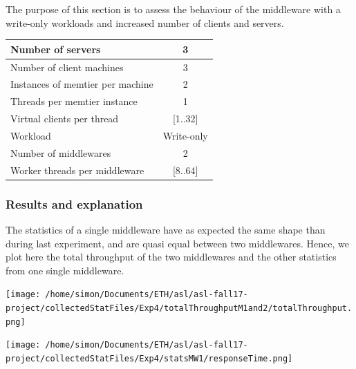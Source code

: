 \documentclass[11pt,a4paper]{article}
\begin{document}
The purpose of this section is to assess the behaviour of the middleware with a write-only workloads and increased number of clients and servers.

\begin{center}
	\scriptsize{
		\begin{tabular}{|l|c|}
			\hline Number of servers                & 3          \\ 
			\hline Number of client machines        & 3          \\ 
			\hline Instances of memtier per machine & 2          \\ 
			\hline Threads per memtier instance     & 1          \\
			\hline Virtual clients per thread       & [1..32]    \\ 
			\hline Workload                         & Write-only \\
			\hline Number of middlewares            & 2          \\
			\hline Worker threads per middleware    & [8..64]    \\
			\hline 
		\end{tabular}
	} 
\end{center}

\subsubsection{Results and explanation}

The statistics of a single middleware have as expected the same shape than during last experiment, and are quasi equal between two middlewares. Hence, we plot here the total throughput of the two middlewares and the other statistics from one single middleware. 

\begin{center}
\texttt{[image: /home/simon/Documents/ETH/asl/asl-fall17-project/collectedStatFiles/Exp4/totalThroughputM1and2/totalThroughput.png]}
\end{center}
 \begin{center}
\texttt{[image: /home/simon/Documents/ETH/asl/asl-fall17-project/collectedStatFiles/Exp4/statsMW1/responseTime.png]}
\end{center}
\end{document}
